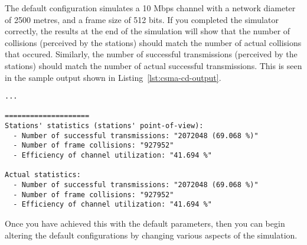 \documentclass[11pt]{article}
\begin{document}
The default configuration simulates a 10 Mbps channel with a network diameter of 2500 metres, and a frame size of 512 bits.
If you completed the simulator correctly, the results at the end of the simulation will show that the number of collisions (perceived by the stations) should match the number of actual collisions that occured.
Similarly, the number of successful transmissions (perceived by the stations) should match the number of actual successful transmissions.
This is seen in the sample output shown in Listing~\ref{lst:csma-cd-output}.



\begin{lstlisting}[style=ece361shell, caption={Sample output of CSMA/CD simulator, where the stations accurately counted the number of collisions.}, label={lst:csma-cd-output}]
...

====================
Stations' statistics (stations' point-of-view):
  - Number of successful transmissions: "2072048 (69.068 %)"
  - Number of frame collisions: "927952"
  - Efficiency of channel utilization: "41.694 %"

Actual statistics:
  - Number of successful transmissions: "2072048 (69.068 %)"
  - Number of frame collisions: "927952"
  - Efficiency of channel utilization: "41.694 %"
\end{lstlisting}

Once you have achieved this with the default parameters, then you can begin altering the default configurations by changing various aspects of the simulation.


\end{document}
